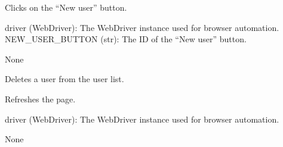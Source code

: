 \documentclass[letterpaper,10pt,english]{sphinxmanual}
\begin{document}

\begin{fulllineitems}
\label{\detokenize{utils:utils.user_management.open_new_user_form}}
\pysigstartsignatures
{}
\pysigstopsignatures
\sphinxAtStartPar
Clicks on the “New user” button.
\begin{description}
\sphinxAtStartPar
driver (WebDriver): The WebDriver instance used for browser automation.
NEW\_USER\_BUTTON (str): The ID of the “New user” button.

\sphinxAtStartPar
None

\end{description}

\end{fulllineitems}


\begin{fulllineitems}
\label{\detokenize{utils:utils.user_management.perform_delete_user}}
\pysigstartsignatures
{}
\pysigstopsignatures
\sphinxAtStartPar
Deletes a user from the user list.

\end{fulllineitems}


\begin{fulllineitems}
\label{\detokenize{utils:utils.user_management.refresh_page}}
\pysigstartsignatures
{}
\pysigstopsignatures
\sphinxAtStartPar
Refreshes the page.
\begin{description}
\sphinxAtStartPar
driver (WebDriver): The WebDriver instance used for browser automation.

\sphinxAtStartPar
None

\end{description}

\end{fulllineitems}
\end{document}
